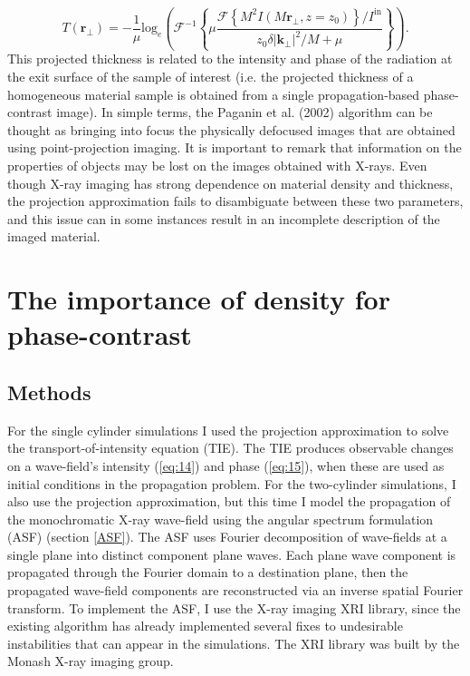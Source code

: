 \documentclass[10pt, a4paper, singlespacing]{report}
\begin{document}
\begin{equation}\label{eq:24}
T(\mathbf{r}_{\perp}) = - \frac{1}{\mu} \mathrm{log}_{e} \left ( \mathscr{F}^{-1} \left \{ \mu \frac{ \mathscr{F} \left \{M^2 I(M\mathbf{r}_{\perp}, z=z_0) \right \} /  I^{\mathrm{in}}}{z_0 \delta |\mathbf{k}_{\perp}|^{2}/M + \mu}  \right \} \right ).
\end{equation}
This projected thickness is related to the intensity and phase of the radiation at the exit surface of the sample of interest (i.e. the projected thickness of a homogeneous material sample is obtained from a single propagation-based phase-contrast image).
In simple terms, the Paganin et al. (2002) algorithm can be thought as bringing into focus the physically defocused images that are obtained using point-projection imaging\cite{Pags2002}.
It is important to remark that information on the properties of objects may be lost on the images obtained with X-rays. Even though X-ray imaging has strong dependence on material density and thickness\cite{CH49}, the projection approximation fails to disambiguate between these two parameters, and this issue can in some instances result in an incomplete description of the imaged material.

\chapter{The importance of density for phase-contrast}\label{density}

\section{Methods}\label{Methods}
For the single cylinder simulations I used the projection approximation to solve the transport-of-intensity equation (TIE). The TIE produces observable changes on a wave-field's intensity (\ref{eq:14}) and phase (\ref{eq:15}), when these are used as initial conditions in the propagation problem. For the two-cylinder simulations, I also use the projection approximation, but this time I model the propagation of the monochromatic X-ray wave-field using the angular spectrum formulation (ASF) (section \ref{ASF}). The ASF uses Fourier decomposition of wave-fields at a single plane into distinct component plane waves. Each plane wave component is propagated through the Fourier domain to a destination plane, then the propagated wave-field components are reconstructed via an inverse spatial Fourier transform\cite{Goodman}. To implement the ASF, I use the X-ray imaging XRI library, since the existing algorithm has already implemented several fixes to undesirable instabilities that can appear in the simulations. The XRI library was built by the Monash X-ray imaging group.
\end{document}
